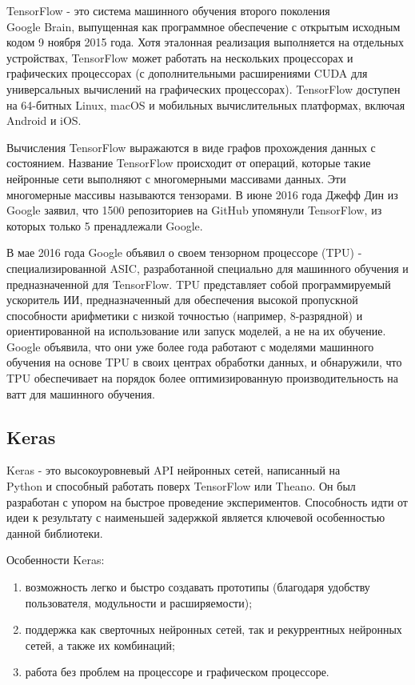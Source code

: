 TensorFlow - это система машинного обучения второго поколения \\Google Brain, выпущенная как программное обеспечение с открытым исходным кодом 9 ноября 2015 года. Хотя эталонная реализация выполняется на отдельных устройствах, TensorFlow может работать на нескольких процессорах и графических процессорах (с дополнительными расширениями CUDA для универсальных вычислений на графических процессорах). TensorFlow доступен на 64-битных Linux, macOS и мобильных вычислительных платформах, включая Android и iOS.

Вычисления TensorFlow выражаются в виде графов прохождения данных с состоянием. Название TensorFlow происходит от операций, которые такие нейронные сети выполняют с многомерными массивами данных. Эти многомерные массивы называются тензорами. В июне 2016 года Джефф Дин из Google заявил, что 1500 репозиториев на GitHub упомянули TensorFlow, из которых только 5 пренадлежали Google.

В мае 2016 года Google объявил о своем тензорном процессоре (TPU) - специализированной ASIC, разработанной специально для машинного обучения и предназначенной для TensorFlow. TPU представляет собой программируемый ускоритель ИИ, предназначенный для обеспечения высокой пропускной способности арифметики с низкой точностью (например, 8-разрядной) и ориентированной на использование или запуск моделей, а не на их обучение. Google объявила, что они уже более года работают с моделями машинного обучения на основе TPU в своих центрах обработки данных, и обнаружили, что TPU обеспечивает на порядок более оптимизированную производительность на ватт для машинного обучения.

\subsection{Keras}
\label{sec:development:keras}

Keras - это высокоуровневый API нейронных сетей, написанный на \\Python и способный работать поверх TensorFlow или Theano. Он был разработан с упором на быстрое проведение экспериментов. Способность идти от идеи к результату с наименьшей задержкой является ключевой особенностью данной библиотеки.

Особенности Keras:
\begin{enumerate}
  \item возможность легко и быстро создавать прототипы (благодаря удобству пользователя, модульности и расширяемости);
  \item поддержка как сверточных нейронных сетей, так и рекуррентных нейронных сетей, а также их комбинаций;
  \item работа без проблем на процессоре и графическом процессоре.
\end{enumerate}

